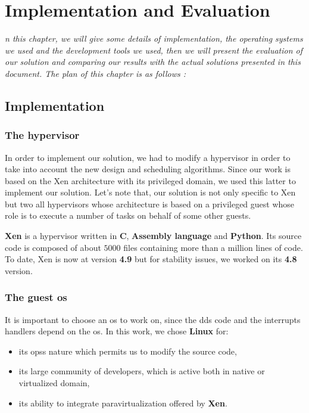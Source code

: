 \chapter{Implementation and Evaluation}
\label{chap:implemeval}
\textit{n this chapter, we will give some details of implementation, the operating systems we used and the development tools we used, then we will present the evaluation of our solution and comparing our results with the actual solutions presented in this document. The plan of this chapter is as follows : 
}

\minitoc

\newpage
\section{Implementation}

\subsection{The hypervisor}

In order to implement our solution, we had to modify a hypervisor in order to take into account the new design and scheduling algorithms. Since our work is based on the Xen architecture with its privileged domain, we used this latter to implement our solution. Let's note that, our solution is not only specific to Xen but two all hypervisors whose architecture is based on a privileged guest whose role is to execute a number of tasks on behalf of some other guests. 

\textbf{Xen} is a hypervisor written in \textbf{C}, \textbf{Assembly language} and \textbf{Python}. Its source code is composed of about $5000$ files containing more than a million lines of code. To date, Xen is now at version \textbf{4.9} but for stability issues, we worked on its \textbf{4.8} version.

\subsection{The guest \acrshort{os}}
It is important to choose an \acrshort{os} to work on, since the \glspl{dd} code and the \glspl{interrupt} handlers depend on the \acrshort{os}. In this work, we chose \textbf{Linux} for: 

\begin{itemize}
    \item its \glspl{ops} nature which permits us to modify the source code,
    \item its large community of developers, which is active both in native or virtualized domain,
    \item its ability to integrate paravirtualization offered by \textbf{Xen}.
\end{itemize}

